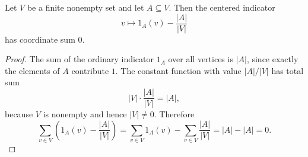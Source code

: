 \begin{helper}
Let \(V\) be a finite nonempty set and let \(A\subseteq V\). Then the centered indicator
\[
  v\mapsto 1_A(v)-\frac{|A|}{|V|}
\]
has coordinate sum \(0\).
\end{helper}
\begin{proof}
The sum of the ordinary indicator \(1_A\) over all vertices is \(|A|\), since exactly the elements of \(A\) contribute \(1\). The constant function with value \(|A|/|V|\) has total sum
\[
  |V|\cdot \frac{|A|}{|V|}=|A|,
\]
because \(V\) is nonempty and hence \(|V|\ne 0\). Therefore
\[
  \sum_{v\in V}\left(1_A(v)-\frac{|A|}{|V|}\right)
  =
  \sum_{v\in V}1_A(v)-\sum_{v\in V}\frac{|A|}{|V|}
  =
  |A|-|A|=0.
\]
\end{proof}
